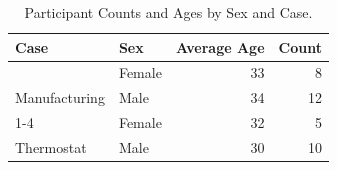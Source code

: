 \begin{table}
\centering
\caption{\label{tab:dems}Participant Counts and Ages by Sex and Case.}
\centering
\begin{tabular}[t]{llrr}
\toprule
Case & Sex & Average Age & Count\\
\midrule
 & Female & 33 & 8\\

\multirow{-2}{*}{\raggedright\arraybackslash Manufacturing} & Male & 34 & 12\\
\cmidrule{1-4}
 & Female & 32 & 5\\

\multirow{-2}{*}{\raggedright\arraybackslash Thermostat} & Male & 30 & 10\\
\bottomrule
\end{tabular}
\end{table}